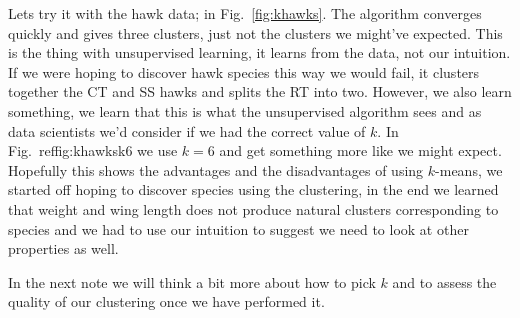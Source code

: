 \documentclass[12pt]{article}
\begin{document}
Lets try it with the hawk data; in Fig.~\ref{fig:khawks}. The
algorithm converges quickly and gives three clusters, just not the
clusters we might've expected. This is the thing with unsupervised
learning, it learns from the data, not our intuition. If we were
hoping to discover hawk species this way we would fail, it clusters
together the CT and SS hawks and splits the RT into two. However, we
also learn something, we learn that this is what the unsupervised
algorithm sees and as data scientists we'd consider if we had the
correct value of $k$. In Fig.~ref{fig:khawksk6} we use $k=6$ and get
something more like we might expect. Hopefully this shows the
advantages and the disadvantages of using $k$-means, we started off
hoping to discover species using the clustering, in the end we learned
that weight and wing length does not produce natural clusters
corresponding to species and we had to use our intuition to suggest we
need to look at other properties as well.

In the next note we will think a bit more about how to pick $k$ and to
assess the quality of our clustering once we have performed it.
\end{document}
